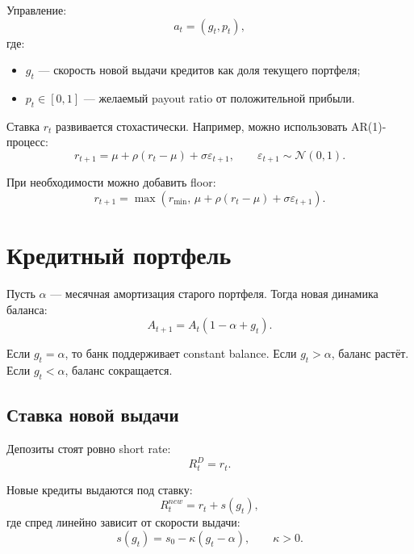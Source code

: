 \documentclass[11pt,a4paper]{article}
\newcommand{\1}{\mathbf{1}}
\begin{document}
Управление:
\begin{equation}
    a_t = (g_t, p_t),
\end{equation}
где:
\begin{itemize}[noitemsep]
    \item $g_t$ --- скорость новой выдачи кредитов как доля текущего портфеля;
    \item $p_t \in [0,1]$ --- желаемый payout ratio от положительной прибыли.
\end{itemize}

Ставка $r_t$ развивается стохастически. Например, можно использовать AR(1)-процесс:
\begin{equation}
    r_{t+1} = \mu + \rho(r_t-\mu) + \sigma \varepsilon_{t+1},
    \qquad \varepsilon_{t+1}\sim\mathcal{N}(0,1).
\end{equation}

При необходимости можно добавить floor:
\begin{equation}
    r_{t+1} = \max\left(r_{\min},\, \mu + \rho(r_t-\mu)+\sigma\varepsilon_{t+1}\right).
\end{equation}

\section{Кредитный портфель}

Пусть $\alpha$ --- месячная амортизация старого портфеля. Тогда новая динамика баланса:
\begin{equation}
    A_{t+1} = A_t(1-\alpha+g_t).
\end{equation}

Если $g_t=\alpha$, то банк поддерживает constant balance. Если $g_t>\alpha$, баланс растёт. Если $g_t<\alpha$, баланс сокращается.

\subsection{Ставка новой выдачи}

Депозиты стоят ровно short rate:
\begin{equation}
    R_t^D = r_t.
\end{equation}

Новые кредиты выдаются под ставку:
\begin{equation}
    R_t^{new} = r_t + s(g_t),
\end{equation}
где спред линейно зависит от скорости выдачи:
\begin{equation}
    s(g_t) = s_0 - \kappa(g_t-\alpha), \qquad \kappa>0.
\end{equation}
\end{document}
